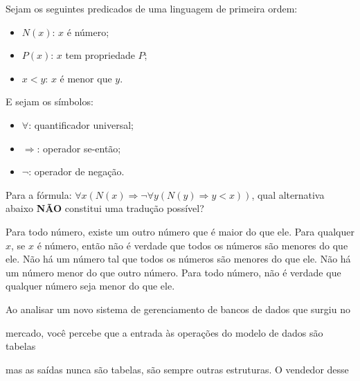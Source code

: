 \documentclass[12pt, addpoints]{exam}
\begin{document}
\begin{questions}
\question

Sejam os seguintes predicados de uma linguagem de primeira ordem:



\begin{itemize}

    \item \( N(x) \): \( x \) é número;

    \item \( P(x) \): \( x \) tem propriedade \( P \);

    \item \( x < y \): \( x \) é menor que \( y \).

\end{itemize}



E sejam os símbolos:

\begin{itemize}

    \item \( \forall \): quantificador universal;

    \item \( \Rightarrow \): operador se-então;

    \item \( \neg \): operador de negação.

\end{itemize}



Para a fórmula: \( \forall x (N(x) \Rightarrow \neg \forall y (N(y) \Rightarrow y < x)) \), qual alternativa abaixo \textbf{NÃO} constitui uma tradução possível?


\begin{choices}
\choice Para todo número, existe um outro número que é maior do que ele.
\choice Para qualquer \( x \), se \( x \) é número, então não é verdade que todos os números são menores do que ele.
\choice Não há um número tal que todos os números são menores do que ele.
\choice Não há um número menor do que outro número.
\choice Para todo número, não é verdade que qualquer número seja menor do que ele.
\end{choices}

\question

Ao analisar um novo sistema de gerenciamento de bancos de dados que surgiu no

mercado, você percebe que a entrada às operações do modelo de dados são tabelas

mas as saídas nunca são tabelas, são sempre outras estruturas. O vendedor desse


\end{questions}
\end{document}
